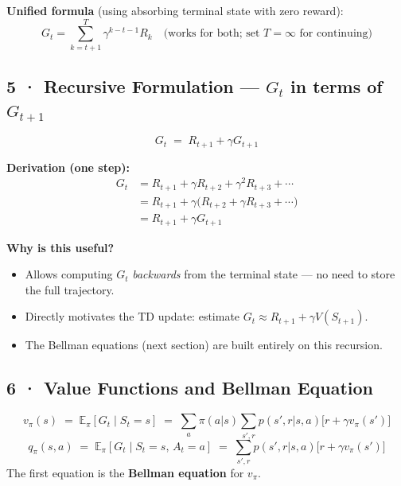 \documentclass[11pt,a4paper]{article}
\begin{document}
\textbf{Unified formula} (using absorbing terminal state with zero reward):
\[
  G_t = \sum_{k=t+1}^{T} \gamma^{k-t-1} R_k \quad \text{(works for both; set } T=\infty \text{ for continuing)}
\]

\subsection*{5 · Recursive Formulation — $G_t$ in terms of $G_{t+1}$}

\begin{tcolorbox}[bold={Key Recursion — used in every RL algorithm}]
\[
  G_t \;=\; R_{t+1} + \gamma G_{t+1}
\]
\end{tcolorbox}

\textbf{Derivation (one step):}
\begin{align*}
  G_t &= R_{t+1} + \gamma R_{t+2} + \gamma^2 R_{t+3} + \cdots \\
      &= R_{t+1} + \gamma \bigl( R_{t+2} + \gamma R_{t+3} + \cdots \bigr) \\
      &= R_{t+1} + \gamma G_{t+1}
\end{align*}

\textbf{Why is this useful?}
\begin{itemize}
  \item Allows computing $G_t$ \emph{backwards} from the terminal state — no need to store the full trajectory.
  \item Directly motivates the TD update: estimate $G_t \approx R_{t+1} + \gamma V(S_{t+1})$.
  \item The Bellman equations (next section) are built entirely on this recursion.
\end{itemize}

\subsection*{6 · Value Functions and Bellman Equation}

\begin{tcolorbox}[defn={State-value and action-value functions}]
\[
  v_\pi(s) \;=\; \mathbb{E}_\pi[G_t \mid S_t = s]
           \;=\; \sum_a \pi(a|s) \sum_{s',r} p(s',r|s,a)\bigl[r + \gamma v_\pi(s')\bigr]
\]
\[
  q_\pi(s,a) \;=\; \mathbb{E}_\pi[G_t \mid S_t = s,\, A_t = a]
             \;=\; \sum_{s',r} p(s',r|s,a)\bigl[r + \gamma v_\pi(s')\bigr]
\]
The first equation is the \textbf{Bellman equation} for $v_\pi$.
\end{tcolorbox}
\end{document}
